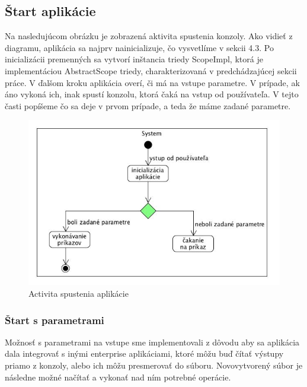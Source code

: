 \subsection{Štart aplikácie}
\indent  Na nasledujúcom obrázku je zobrazená aktivita spustenia konzoly. Ako vidieť z diagramu, aplikácia sa najprv nainicializuje, čo vysvetlíme v sekcii 4.3. Po inicializácii premenných sa vytvorí inštancia triedy ScopeImpl, ktorá je implementáciou AbstractScope triedy, charakterizovaná v predchádzajúcej sekcii práce. V ďalšom kroku aplikácia overí, či má na vstupe parametre. V prípade, ak áno vykoná ich, inak spustí konzolu, ktorá čaká na vstup od používateľa. V tejto časti popíšeme čo sa deje v prvom prípade, a teda že máme zadané parametre. 
\begin{figure}[!htbp]
	\centering
	\includegraphics[width=\linewidth]{img/System.jpg}
	\caption{Activita spustenia aplikácie}
	\label{fig:test}
\end{figure}
\subsubsection{Štart s parametrami}
\indent Možnosť s parametrami na vstupe sme implementovali z dôvodu aby sa aplikácia dala integrovať s inými enterprise aplikáciami, ktoré môžu buď čítať výstupy priamo z konzoly, alebo ich môžu presmerovať do súboru. Novovytvorený súbor je následne možné načítať a vykonať nad ním potrebné operácie.
\newpage
